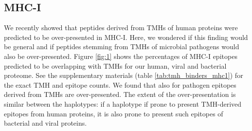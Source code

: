 \subsection{MHC-I}

We recently showed that peptides derived from TMHs of human proteins 
were predicted to be over-presented in MHC-I. 
Here, we wondered if this finding would be general 
and if peptides stemming from TMHs of microbial pathogens 
would also be over-presented.
Figure \ref{fig:1} shows the percentages of MHC-I epitopes 
predicted to be overlapping 
with TMHs for our human, viral and bacterial proteome.
See the supplementary materials (table \ref{tab:tmh_binders_mhc1}) 
for the exact TMH and epitope counts.
We found that also for pathogen epitopes derived from TMHs are
over-presented. 
The extent of the over-presentation is similar between the haplotypes:
if a haplotype if prone to present TMH-derived epitopes from
human proteins, it is also prone to present such epitopes of
bacterial and viral proteins.

